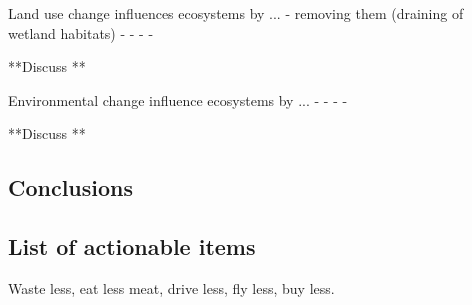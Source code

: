 \documentclass[12pt]{article}
\begin{document}
Land use change influences ecosystems by ...
- removing them (draining of wetland habitats)
- 
- 
- 
-

**Discuss **






Environmental change influence ecosystems by ...
- 
- 
- 
- 


**Discuss **













\bigskip
\subsection*{Conclusions}














\bigskip
\subsection*{List of actionable items}

Waste less, eat less meat, drive less, fly less, buy less. 
\end{document}
